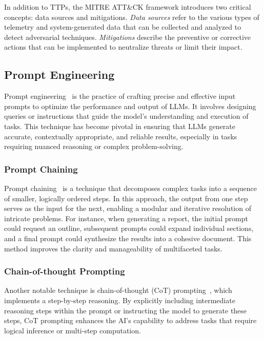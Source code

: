 In addition to TTPs, the MITRE ATT\&CK framework introduces two critical concepts: data sources and mitigations. 
\textit{Data sources} refer to the various types of telemetry and system-generated data that can be collected and analyzed to detect adversarial techniques.
\textit{Mitigations} describe the preventive or corrective actions that can be implemented to neutralize threats or limit their impact.

\subsection{Prompt Engineering}

Prompt engineering~\cite{sahoo2024systematic} is the practice of crafting precise and effective input prompts to optimize the performance and output of LLMs.
It involves designing queries or instructions that guide the model's understanding and execution of tasks. 
This technique has become pivotal in ensuring that LLMs generate accurate, contextually appropriate, and reliable results, especially in tasks requiring nuanced reasoning or complex problem-solving.

\subsubsection{Prompt Chaining}

Prompt chaining~\cite{wu2022promptchainer} is a technique that decomposes complex tasks into a sequence of smaller, logically ordered steps. 
In this approach, the output from one step serves as the input for the next, enabling a modular and iterative resolution of intricate problems. 
For instance, when generating a report, the initial prompt could request an outline, subsequent prompts could expand individual sections, and a final prompt could synthesize the results into a cohesive document. 
This method improves the clarity and manageability of multifaceted tasks.

\subsubsection{Chain-of-thought Prompting}
Another notable technique is chain-of-thought (CoT) prompting~\cite{wei2022chain}, which implements a step-by-step reasoning.
By explicitly including intermediate reasoning steps within the prompt or instructing the model to generate these steps, CoT prompting enhances the AI's capability to address tasks that require logical inference or multi-step computation.

